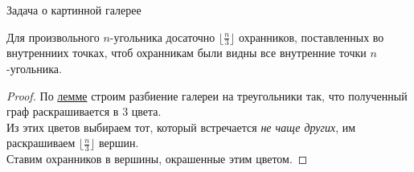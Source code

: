 \documentclass[12pt,aspectratio=169,svgnames]{beamer}
\begin{document}
    \begin{frame}{Задача о картинной галерее}
        
        \vspace{2mm}
        \begin{thm}[Хватал]

            Для произвольного $n$-угольника досаточно $\lfloor \frac{n}{3} \rfloor$ охранников, поставленных во внутренниих точках, чтоб охранникам были видны
            все внутренние точки $n$-угольника.

        \end{thm}

        \begin{proof}

            По \hyperlink{trianglemm}{лемме} строим разбиение галереи на треугольники так, что полученный граф раскрашивается в 3 цвета. \\
            Из этих цветов выбираем тот, который встречается \emph{не чаще других}, им раскрашиваем $\lfloor \frac{n}{3} \rfloor$ вершин.\\
            Ставим охранников в вершины, окрашенные этим цветом.

        \end{proof}
    \end{frame}
\end{document}
